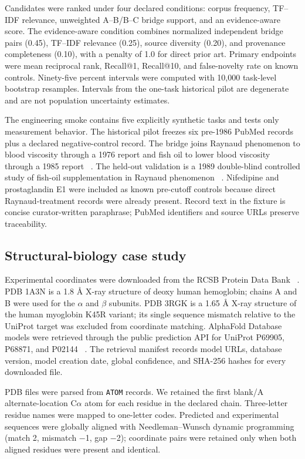 \documentclass[11pt]{article}
\begin{document}
Candidates were ranked under four declared conditions: corpus frequency, TF--IDF relevance, unweighted A--B/B--C bridge support, and an evidence-aware score. The evidence-aware condition combines normalized independent bridge pairs (0.45), TF--IDF relevance (0.25), source diversity (0.20), and provenance completeness (0.10), with a penalty of 1.0 for direct prior art. Primary endpoints were mean reciprocal rank, Recall@1, Recall@10, and false-novelty rate on known controls. Ninety-five percent intervals were computed with 10,000 task-level bootstrap resamples. Intervals from the one-task historical pilot are degenerate and are not population uncertainty estimates.

The engineering smoke contains five explicitly synthetic tasks and tests only measurement behavior. The historical pilot freezes six pre-1986 PubMed records plus a declared negative-control record. The bridge joins Raynaud phenomenon to blood viscosity through a 1976 report and fish oil to lower blood viscosity through a 1985 report ~\cite{ref14,ref15}. The held-out validation is a 1989 double-blind controlled study of fish-oil supplementation in Raynaud phenomenon ~\cite{ref16}. Nifedipine and prostaglandin E1 were included as known pre-cutoff controls because direct Raynaud-treatment records were already present. Record text in the fixture is concise curator-written paraphrase; PubMed identifiers and source URLs preserve traceability.

\subsection{Structural-biology case study}

Experimental coordinates were downloaded from the RCSB Protein Data Bank ~\cite{ref6}. PDB 1A3N is a 1.8 \AA{} X-ray structure of deoxy human hemoglobin; chains A and B were used for the $\alpha$ and $\beta$ subunits. PDB 3RGK is a 1.65 \AA{} X-ray structure of the human myoglobin K45R variant; its single sequence mismatch relative to the UniProt target was excluded from coordinate matching. AlphaFold Database models were retrieved through the public prediction API for UniProt P69905, P68871, and P02144 ~\cite{ref7}. The retrieval manifest records model URLs, database version, model creation date, global confidence, and SHA-256 hashes for every downloaded file.

PDB files were parsed from \nolinkurl{ATOM} records. We retained the first blank/A alternate-location C$\alpha$ atom for each residue in the declared chain. Three-letter residue names were mapped to one-letter codes. Predicted and experimental sequences were globally aligned with Needleman--Wunsch dynamic programming (match 2, mismatch $-$1, gap $-$2); coordinate pairs were retained only when both aligned residues were present and identical.
\end{document}
